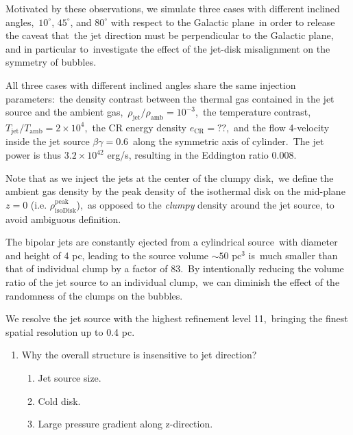 \documentclass[twocolumn]{aastex631}
\begin{document}
  Motivated by these observations, we simulate three cases with different inclined angles,\
  $10^{\circ}$, $45^{\circ}$, and $80^{\circ}$ with respect to the Galactic plane\
  in order to release the caveat that\
  the jet direction must be perpendicular to the Galactic plane, and in particular to\
  investigate the effect of the jet-disk misalignment on the symmetry of bubbles.


  All three cases with different inclined angles share the same injection parameters:\
  the density contrast between the thermal gas contained in the jet source and the ambient gas,\
  $\rho_{\text{jet}}/\rho_{\text{amb}}=10^{-3}$,\
  the temperature contrast, $T_{\text{jet}}/T_{\text{amb}}=2\times10^{4}$,\
  the CR energy density $e_{\text{CR}}=??$,\
  and the flow 4-velocity inside the jet source $\beta\gamma = 0.6$\
  along the symmetric axis of cylinder.\
  The jet power is thus $3.2\times 10^{42}$ erg/s, resulting in the Eddington ratio 0.008.

  Note that as we inject the jets at the center of the clumpy disk,\
  we define the ambient gas density by the peak density of\
  the isothermal disk on the mid-plane $z=0$ (i.e. $\rho^{\text{peak}}_{\text{isoDisk}}$),\
  as opposed to the \textit{clumpy} density around the jet source, to avoid ambiguous definition.


  The bipolar jets are constantly ejected from a cylindrical source\
  with diameter and height of 4 pc, leading to the source volume $\sim 50 \text{ pc}^{3}$ is\
  much smaller than that of individual clump by a factor of 83.\
  By intentionally reducing the volume ratio of the jet source to an individual clump,\
  we can diminish the effect of the randomness of the clumps on the bubbles.

  We resolve the jet source with the highest refinement level 11,\
  bringing the finest spatial resolution up to 0.4 pc.\


 \begin{enumerate}
    \item Why the overall structure is insensitive to jet direction?
      \begin{enumerate}
        \item Jet source size.
        \item Cold disk.
        \item Large pressure gradient along z-direction.
      \end{enumerate}
 \end{enumerate}
\end{document}

